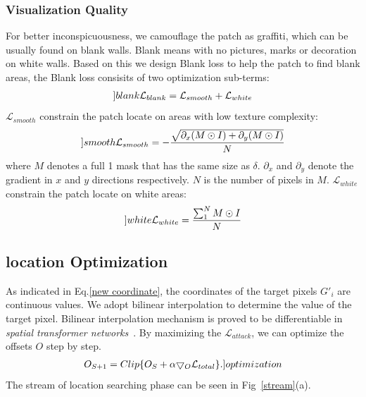 \documentclass[10pt,twocolumn,letterpaper]{article}
\begin{document}
\subsubsection{Visualization Quality}
For better inconspicuousness, we camouflage the patch 
as graffiti, which can be usually found on 
blank walls. Blank means with no pictures, marks or 
decoration on white walls.
Based on this we design Blank loss to help the patch to 
find blank areas, the Blank loss
consisits of two optimization sub-terms:
	\begin{align}
		\label[]{blank}
		\mathcal{L}_{blank} = \mathcal{L}_{smooth}+\mathcal{L}_{white}
 	\end{align}
$\mathcal{L}_{smooth}$ constrain the patch locate
on areas with low texture complexity:
	\begin{align}
		\label[]{smooth}
		\mathcal{L}_{smooth} = 
		-\frac{\sqrt{\partial_x (M \odot I) + \partial_y (M \odot I)}}{N} 
 	\end{align}
where $M$ denotes a full 1 mask that has the 
same size as $\delta$. $\partial_x$ and $\partial_y$
denote the gradient in $x$ and $y$ directions respectively.
$N$ is the number of pixels in $M$.
$\mathcal{L}_{white}$ constrain the patch locate
 on white areas:
	\begin{align}
		\label[]{white}
		\mathcal{L}_{white} = \frac{\sum_{1}^{N} M \odot I}{N} 
 	\end{align}

\subsection{location Optimization}
As indicated in Eq.\ref{new coordinate},
the coordinates of the target pixels $G'_i$ are continuous values. 
We adopt bilinear interpolation to determine the value of 
the target pixel. 
Bilinear interpolation mechanism is proved 
to be differentiable in 
\textit{spatial transformer networks}~\cite{stn}.
By maximizing the $\mathcal{L}_{attack}$, 
we can optimize the offsets $O$ step by step.
\begin{align}
	O_{S+1} = Clip 
	\{O_{S} + \alpha 
	{\bigtriangledown_{O}\mathcal{L}_{total}}\}. 
	\label[]{optimization}
\end{align}
The stream of location searching phase can be seen in 
Fig~\ref{stream}(a). 
\end{document}
